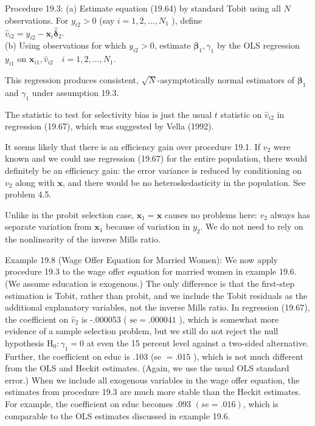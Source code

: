 \documentclass[10pt]{article}
\begin{document}
Procedure 19.3: (a) Estimate equation (19.64) by standard Tobit using all $N$ observations. For $y_{i 2}>0$ (say $i=1,2, \ldots, N_{1}$ ), define\\
$\hat{v}_{i 2}=y_{i 2}-\mathbf{x}_{i} \hat{\boldsymbol{\delta}}_{2}$.\\
(b) Using observations for which $y_{i 2}>0$, estimate $\boldsymbol{\beta}_{1}, \gamma_{1}$ by the OLS regression\\
$y_{i 1}$ on $\mathbf{x}_{i 1}, \hat{v}_{i 2} \quad i=1,2, \ldots, N_{1}$.

This regression produces consistent, $\sqrt{N}$-asymptotically normal estimators of $\boldsymbol{\beta}_{1}$ and $\gamma_{1}$ under assumption 19.3.

The statistic to test for selectivity bias is just the usual $t$ statistic on $\hat{v}_{i 2}$ in regression (19.67), which was suggested by Vella (1992).

It seems likely that there is an efficiency gain over procedure 19.1. If $v_{2}$ were known and we could use regression (19.67) for the entire population, there would definitely be an efficiency gain: the error variance is reduced by conditioning on $v_{2}$ along with $\mathbf{x}$, and there would be no heteroskedasticity in the population. See problem 4.5.

Unlike in the probit selection case, $\mathbf{x}_{1}=\mathbf{x}$ causes no problems here: $v_{2}$ always has separate variation from $\mathbf{x}_{1}$ because of variation in $y_{2}$. We do not need to rely on the nonlinearity of the inverse Mills ratio.

Example 19.8 (Wage Offer Equation for Married Women): We now apply procedure 19.3 to the wage offer equation for married women in example 19.6. (We assume education is exogenous.) The only difference is that the first-step estimation is Tobit, rather than probit, and we include the Tobit residuals as the additional explanatory variables, not the inverse Mills ratio. In regression (19.67), the coefficient on $\hat{v}_{2}$ is -.000053 ( $\mathrm{se}=.000041$ ), which is somewhat more evidence of a sample selection problem, but we still do not reject the null hypothesis $\mathrm{H}_{0}: \gamma_{1}=0$ at even the 15 percent level against a two-sided alternative. Further, the coefficient on educ is .103 (se $=.015$ ), which is not much different from the OLS and Heckit estimates. (Again, we use the usual OLS standard error.) When we include all exogenous variables in the wage offer equation, the estimates from procedure 19.3 are much more stable than the Heckit estimates. For example, the coefficient on educ becomes .093 $(s e=.016)$, which is comparable to the OLS estimates discussed in example 19.6.
\end{document}
